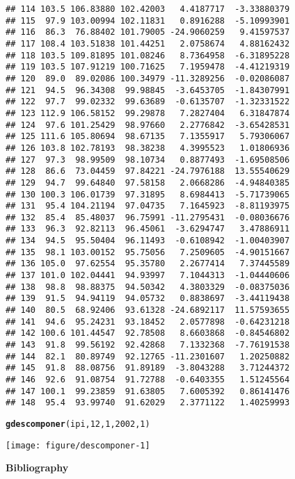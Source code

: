 \documentclass{article}\usepackage[]{graphicx}\usepackage[]{color}
\makeatletter
\def\maxwidth{ %
  \ifdim\Gin@nat@width>\linewidth
    \linewidth
  \else
    \Gin@nat@width
  \fi
}
\newcommand{\hlnum}[1]{\textcolor[rgb]{0.686,0.059,0.569}{#1}}%
\newcommand{\hlstd}[1]{\textcolor[rgb]{0.345,0.345,0.345}{#1}}%
\newcommand{\hlkwd}[1]{\textcolor[rgb]{0.737,0.353,0.396}{\textbf{#1}}}%
\newenvironment{kframe}{%
 \def\at@end@of@kframe{}%
 \ifinner\ifhmode%
  \def\at@end@of@kframe{\end{minipage}}%
  \begin{minipage}{\columnwidth}%
 \fi\fi%
 \def\FrameCommand##1{\hskip\@totalleftmargin \hskip-\fboxsep
 \colorbox{shadecolor}{##1}\hskip-\fboxsep
     \hskip-\linewidth \hskip-\@totalleftmargin \hskip\columnwidth}%
 \MakeFramed {\advance\hsize-\width
   \@totalleftmargin\z@ \linewidth\hsize
   \@setminipage}}%
 {\par\unskip\endMakeFramed%
 \at@end@of@kframe}
\newenvironment{knitrout}{}{} %
\makeatother
\begin{document}
\begin{knitrout}
\begin{kframe}
\begin{verbatim}
## 114 103.5 106.83880 102.42003   4.4187717  -3.33880379
## 115  97.9 103.00994 102.11831   0.8916288  -5.10993901
## 116  86.3  76.88402 101.79005 -24.9060259   9.41597537
## 117 108.4 103.51838 101.44251   2.0758674   4.88162432
## 118 103.5 109.81895 101.08246   8.7364958  -6.31895228
## 119 103.5 107.91219 100.71625   7.1959478  -4.41219319
## 120  89.0  89.02086 100.34979 -11.3289256  -0.02086087
## 121  94.5  96.34308  99.98845  -3.6453705  -1.84307991
## 122  97.7  99.02332  99.63689  -0.6135707  -1.32331522
## 123 112.9 106.58152  99.29878   7.2827404   6.31847874
## 124  97.6 101.25429  98.97660   2.2776842  -3.65428531
## 125 111.6 105.80694  98.67135   7.1355917   5.79306067
## 126 103.8 102.78193  98.38238   4.3995523   1.01806936
## 127  97.3  98.99509  98.10734   0.8877493  -1.69508506
## 128  86.6  73.04459  97.84221 -24.7976188  13.55540629
## 129  94.7  99.64840  97.58158   2.0668286  -4.94840385
## 130 100.3 106.01739  97.31895   8.6984413  -5.71739065
## 131  95.4 104.21194  97.04735   7.1645923  -8.81193975
## 132  85.4  85.48037  96.75991 -11.2795431  -0.08036676
## 133  96.3  92.82113  96.45061  -3.6294747   3.47886911
## 134  94.5  95.50404  96.11493  -0.6108942  -1.00403907
## 135  98.1 103.00152  95.75056   7.2509605  -4.90151667
## 136 105.0  97.62554  95.35780   2.2677414   7.37445589
## 137 101.0 102.04441  94.93997   7.1044313  -1.04440606
## 138  98.8  98.88375  94.50342   4.3803329  -0.08375036
## 139  91.5  94.94119  94.05732   0.8838697  -3.44119438
## 140  80.5  68.92406  93.61328 -24.6892117  11.57593655
## 141  94.6  95.24231  93.18452   2.0577898  -0.64231218
## 142 100.6 101.44547  92.78508   8.6603868  -0.84546802
## 143  91.8  99.56192  92.42868   7.1332368  -7.76191538
## 144  82.1  80.89749  92.12765 -11.2301607   1.20250882
## 145  91.8  88.08756  91.89189  -3.8043288   3.71244372
## 146  92.6  91.08754  91.72788  -0.6403355   1.51245564
## 147 100.1  99.23859  91.63805   7.6005392   0.86141476
## 148  95.4  93.99740  91.62029   2.3771122   1.40259993
\end{verbatim}
\begin{alltt}
\hlkwd{gdescomponer}\hlstd{(ipi,}\hlnum{12}\hlstd{,}\hlnum{1}\hlstd{,}\hlnum{2002}\hlstd{,}\hlnum{1}\hlstd{)}
\end{alltt}
\end{kframe}
\texttt{[image: figure/descomponer-1]} 

\end{knitrout}


{\bf Bibliography }
\end{document}
